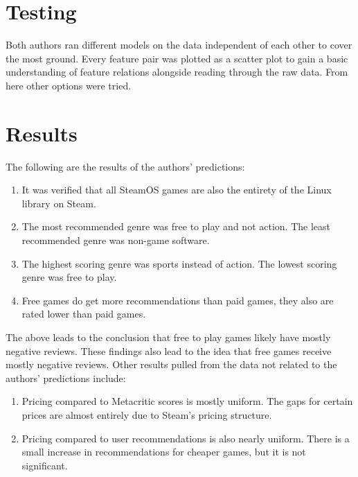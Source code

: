 \documentclass[letterpaper,10pt,twocolumn]{article}
\begin{document}

\section{Testing}

Both authors ran different models on the data independent of each other to
cover the most ground.  Every feature pair was plotted as a scatter plot to
gain a basic understanding of feature relations alongside reading through the
raw data.  From here other options were tried.



\section{Results}

The following are the results of the authors' predictions:

\begin{enumerate}
    \item It was verified that all SteamOS games are also the entirety of the
    Linux library on Steam.

    \item The most recommended genre was free to play and not action. The least
    recommended genre was non-game software.

    \item The highest scoring genre was sports instead of action. The lowest
    scoring genre was free to play.

    \item Free games do get more recommendations than paid games, they also are
    rated lower than paid games.
\end{enumerate}

The above leads to the conclusion that free to play games likely have mostly
negative reviews. These findings also lead to the idea that free games receive
mostly negative reviews. Other results pulled from the data not related to the
authors' predictions include:

\begin{enumerate}
    \item Pricing compared to Metacritic scores is mostly uniform.  The gaps for
    certain prices are almost entirely due to Steam's pricing structure.

    \item Pricing compared to user recommendations is also nearly uniform.  There
    is a small increase in recommendations for cheaper games, but it is not
    significant.
\end{enumerate}
\end{document}
